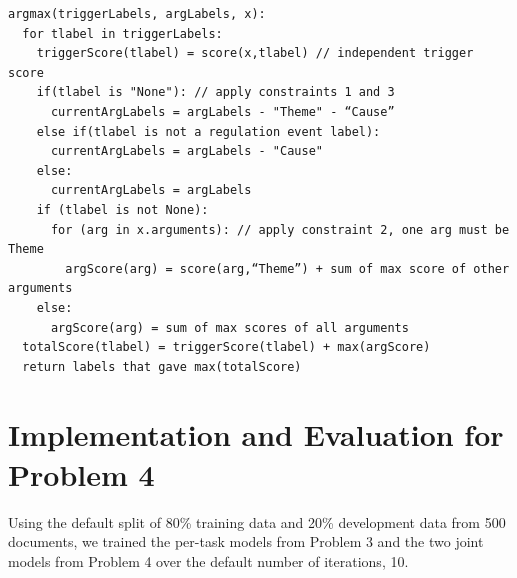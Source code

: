 \documentclass{article} %
\begin{document}
\begin{verbatim}
argmax(triggerLabels, argLabels, x):
  for tlabel in triggerLabels:
    triggerScore(tlabel) = score(x,tlabel) // independent trigger score
    if(tlabel is "None"): // apply constraints 1 and 3
      currentArgLabels = argLabels - "Theme" - “Cause”
    else if(tlabel is not a regulation event label):
      currentArgLabels = argLabels - "Cause" 
    else:
      currentArgLabels = argLabels
    if (tlabel is not None):
      for (arg in x.arguments): // apply constraint 2, one arg must be Theme
        argScore(arg) = score(arg,“Theme”) + sum of max score of other arguments  
    else:
      argScore(arg) = sum of max scores of all arguments   
  totalScore(tlabel) = triggerScore(tlabel) + max(argScore)
  return labels that gave max(totalScore)
\end{verbatim}

\section{Implementation and Evaluation for Problem 4}

Using the default split of 80\% training data and 20\% development data from 500 documents, we trained the per-task models from Problem 3 and the two joint models from Problem 4 over the default number of iterations, 10.
\end{document}

